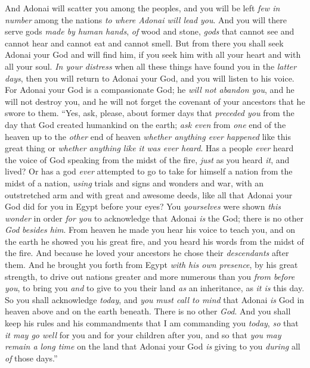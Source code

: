 \begin{biblechapter}
\verse And Adonai will scatter you among the peoples, and you will be left \textit{few in number} among the nations \textit{to where Adonai will lead you}.
\verse And you will there serve gods \textit{made by human hands}, \textit{of} wood and stone, \textit{gods} that cannot see and cannot hear and cannot eat and cannot smell.
\verse But from there you shall seek Adonai your God and will find him, if you seek him with all your heart and with all your soul.
\verse \textit{In your distress} when all these things have found you in the \textit{latter days}, then you will return to Adonai your God, and you will listen to his voice.
\verse For Adonai your God is a compassionate God; he \textit{will not abandon you}, and he will not destroy you, and he will not forget the covenant of your ancestors that he swore to them.
\verse “Yes, ask, please, about former days that \textit{preceded you} from the day that God created humankind on the earth; \textit{ask even} from \textit{one} end of the heaven up to the \textit{other} end of heaven \textit{whether anything ever happened} like this great thing or \textit{whether anything like it was ever heard}.
\verse Has a people \textit{ever} heard the voice of God speaking from the midst of the fire, \textit{just} as you heard \textit{it}, and lived?
\verse Or has a god \textit{ever} attempted to go to take for himself a nation from the midst of a nation, \textit{using} trials and signs and wonders and war, with an outstretched arm and with great and awesome deeds, like all that Adonai your God did for you in Egypt before your eyes?
\verse You \textit{yourselves} were shown \textit{this wonder} in order \textit{for you} to acknowledge that Adonai \textit{is} the God; there is no other \textit{God} \textit{besides him}.
\verse From heaven he made you hear his voice to teach you, and on the earth he showed you his great fire, and you heard his words from the midst of the fire.
\verse And because he loved your ancestors he chose their \textit{descendants} after them. And he brought you forth from Egypt \textit{with his own presence}, by his great strength,
\verse to drive out nations greater and more numerous than you \textit{from before you}, to bring you \textit{and} to give to you their land \textit{as} an inheritance, as \textit{it is} this day.
\verse So you shall acknowledge \textit{today}, and \textit{you must call to mind} that Adonai \textit{is} God in heaven above and on the earth beneath. There is no other \textit{God}.
\verse And you shall keep his rules and his commandments that I am commanding you \textit{today}, \textit{so} that \textit{it may go well} for you and for your children after you, and so that \textit{you may remain a long time} on the land that Adonai your God \textit{is} giving to you \textit{during} all \textit{of} those days.”

\end{biblechapter}
